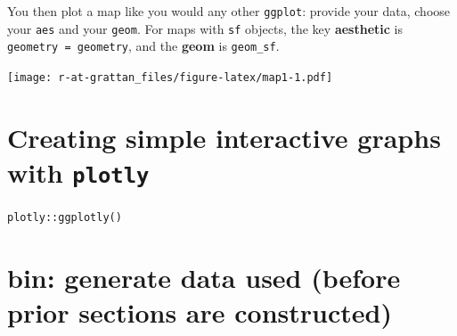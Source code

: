 \documentclass[]{book}
\newenvironment{Shaded}{\begin{snugshade}}{\end{snugshade}}
\newcommand{\DataTypeTok}[1]{\textcolor[rgb]{0.13,0.29,0.53}{#1}}
\newcommand{\DecValTok}[1]{\textcolor[rgb]{0.00,0.00,0.81}{#1}}
\newcommand{\KeywordTok}[1]{\textcolor[rgb]{0.13,0.29,0.53}{\textbf{#1}}}
\newcommand{\NormalTok}[1]{#1}
\newcommand{\OperatorTok}[1]{\textcolor[rgb]{0.81,0.36,0.00}{\textbf{#1}}}
\newcommand{\OtherTok}[1]{\textcolor[rgb]{0.56,0.35,0.01}{#1}}
\newcommand{\StringTok}[1]{\textcolor[rgb]{0.31,0.60,0.02}{#1}}
\begin{document}
You then plot a map like you would any other \texttt{ggplot}: provide your data, choose your \texttt{aes} and your \texttt{geom}. For maps with \texttt{sf} objects, the key \textbf{aesthetic} is \texttt{geometry\ =\ geometry}, and the \textbf{geom} is \texttt{geom\_sf}.

\begin{Shaded}
\end{Shaded}

\texttt{[image: r-at-grattan\_files/figure-latex/map1-1.pdf]}

\hypertarget{creating-simple-interactive-graphs-with-plotly}{%
\section{\texorpdfstring{Creating simple interactive graphs with \texttt{plotly}}{Creating simple interactive graphs with plotly}}\label{creating-simple-interactive-graphs-with-plotly}}

\texttt{plotly::ggplotly()}

\hypertarget{bin-generate-data-used-before-prior-sections-are-constructed}{%
\section{bin: generate data used (before prior sections are constructed)}\label{bin-generate-data-used-before-prior-sections-are-constructed}}
\end{document}

